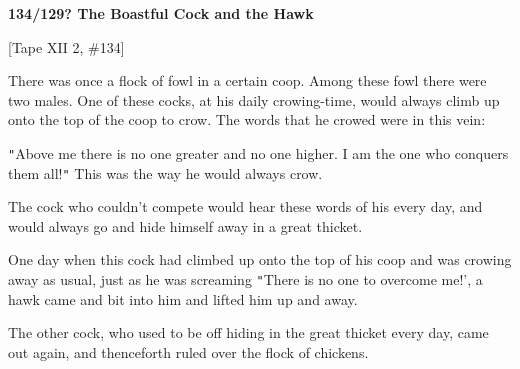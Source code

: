 
\textbf{134/129? The Boastful Cock and the Hawk}

[Tape XII 2, \#134]

There was once a flock of fowl in a certain coop. Among these fowl there were two
males. One of these cocks, at his daily crowing-time, would always climb up onto
the top of the coop to crow. The words that he crowed were in this vein:

\texttt{"}Above me there is no one greater and no one higher. I am the one who
conquers them all!\texttt{"} This was the way he would always crow.

The cock who couldn't compete would hear these words of his every day, and would
always go and hide himself away in a great thicket.

One day when this cock had climbed up onto the top of his coop and was crowing
away as usual, just as he was screaming \texttt{"}There is no one to overcome me!',
a hawk came and bit into him and lifted him up and away.

The other cock, who used to be off hiding in the great thicket every day, came
out again, and thenceforth ruled over the flock of chickens.


